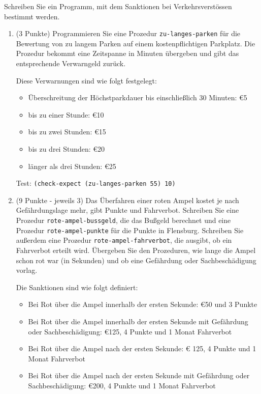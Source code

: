   
Schreiben Sie ein Programm, mit dem Sanktionen
  bei Verkehrsverst\"ossen bestimmt werden.

  \begin{enumerate}
  \item (3 Punkte) Programmieren Sie eine Prozedur
    \texttt{zu-langes-parken} f\"ur die Bewertung von zu langem Parken
    auf einem kostenpflichtigen Parkplatz. Die Prozedur bekommt eine
    Zeitspanne in Minuten \"ubergeben und gibt das entsprechende
    Verwarngeld zur\"uck.

    Diese Verwarnungen sind wie folgt festgelegt:

    \begin{itemize}
    \item \"Uberschreitung der H\"ochstparkdauer bis einschlie\ss lich 30 Minuten:
      \euro 5
    \item bis zu einer Stunde: \euro 10
    \item bis zu zwei Stunden: \euro 15
    \item bis zu drei Stunden: \euro 20
    \item l\"anger als drei Stunden: \euro 25
    \end{itemize}
    
    Test: \texttt{(check-expect (zu-langes-parken 55) 10)}

  \item (9 Punkte - jeweils 3) Das \"Uberfahren einer roten Ampel kostet je
    nach Gef\"ahrdungslage mehr, gibt Punkte und Fahrverbot. Schreiben
    Sie eine Prozedur \texttt{rote-ampel-bussgeld}, die das Bu\ss geld berechnet und eine Prozedur
    \texttt{rote-ampel-punkte} f\"ur die Punkte in
    Flensburg. Schreiben Sie außerdem eine Prozedur
    \texttt{rote-ampel-fahrverbot}, die ausgibt, ob
    ein Fahrverbot erteilt wird. \"Ubergeben Sie den Prozeduren, wie
    lange die Ampel schon rot war (in Sekunden) und ob eine
    Gef\"ahrdung oder Sachbesch\"adigung vorlag.
    
    Die Sanktionen sind wie folgt definiert:

    \begin{itemize}
    \item Bei Rot \"uber die Ampel innerhalb der ersten Sekunde:
      \euro 50 und 3 Punkte
    \item Bei Rot \"uber die Ampel innerhalb der ersten Sekunde mit
      Gef\"ahrdung oder Sachbesch\"adigung: \euro 125, 4 Punkte und
      1 Monat Fahrverbot
    \item Bei Rot \"uber die Ampel nach der ersten Sekunde: \euro
      125, 4 Punkte und 1 Monat Fahrverbot
    \item Bei Rot \"uber die Ampel nach der ersten Sekunde mit
      Gef\"ahrdung oder Sachbesch\"adigung: \euro 200, 4 Punkte und
      1 Monat Fahrverbot
    \end{itemize}
  \end{enumerate}
  
